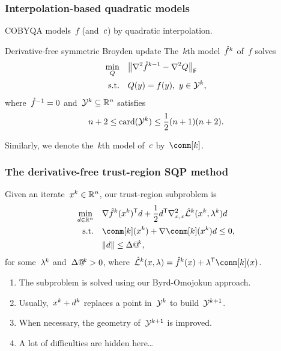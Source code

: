 \documentclass{polyu-presentation}
\makeatletter
\newcommand{\con}[1][]{c\ifthenelse{\equal{#1}{}}{}{_{#1}}}
\newcommand{\iter}[1][]{x\ifthenelse{\equal{#1}{}}{}{^{#1}}}
\newcommand{\lagm}[1][]{\hat{\mathcal{L}}\ifthenelse{\equal{#1}{}}{}{^{#1}}}
\newcommand{\lm}[1][]{\lambda\ifthenelse{\equal{#1}{}}{}{^{#1}}}
\newcommand{\obj}{f}
\newcommand{\objm}[1][]{\hat{f}\ifthenelse{\equal{#1}{}}{}{^{#1}}}
\newcommand{\rad}[1][]{\Delta\ifthenelse{\equal{#1}{}}{}{@\!^{#1}}}
\newcommand{\step}[1][]{d\ifthenelse{\equal{#1}{}}{}{^{#1}}}
\newcommand{\xpt}[1][]{\mathcal{Y}\ifthenelse{\equal{#1}{}}{}{^{#1}}}
\makeatother
\begin{document}
\begin{frame}
    \frametitle{Interpolation-based quadratic models}
    
	COBYQA models~$\obj$ (and~$\con$) by \alert{quadratic} interpolation.

    \medskip

    \begin{block}{Derivative-free symmetric Broyden update}
        The~$k$th model~$\objm[k]$ of~$\obj$ solves
        \begin{align*}
            \min_{Q}    & \quad \norm[\big]{\nabla^2 \objm[k - 1] - \nabla^2 Q}_{\mathsf{F}}\\
            \text{s.t.} & \quad Q(y) = \obj(y), ~ y \in \xpt[k],
        \end{align*}
        where~$\objm[-1] = 0$ and~$\xpt[k] \subseteq \R^n$ satisfies
        \begin{equation*}
            n + 2 \le \card(\xpt[k]) \le \frac{1}{2} (n + 1) (n + 2).
        \end{equation*}
    \end{block}

    \medskip

    Similarly, we denote the~$k$th model of~$\con$ by~$\conm[k]$.
\end{frame}

\begin{frame}
    \frametitle{The derivative-free trust-region SQP method}

    Given an iterate~$\iter[k] \in \R^n$, our \alert{trust-region} subproblem is
    \begin{align*}
        \min_{\step \in \R^n}   & \quad \nabla \objm[k](\iter[k])^{\T} \step + \frac{1}{2} \step^{\T} \nabla_{x, x}^2 \lagm[k](\iter[k], \lm[k]) \step\\
        \text{s.t.}             & \quad \conm[k](\iter[k]) + \nabla \conm[k](\iter[k]) \step \le 0,\\
                                & \quad \norm{\step} \le \rad[k],
    \end{align*}
    for some~$\lm[k]$ and~$\rad[k] > 0$, where~$\lagm[k](\iter, \lm) = \objm[k](\iter) + \lm^{\T} \conm[k](\iter)$.

    \medskip

    \begin{block}{}
        \begin{enumerate}
            \item The subproblem is solved using our \alert{Byrd-Omojokun} approach.
            \item Usually,~$\iter[k] + \step[k]$ replaces a point in~$\xpt[k]$ to build~$\xpt[k + 1]$.
            \item When necessary, the \alert{geometry} of~$\xpt[k + 1]$ is improved.
            \item A lot of \alert{difficulties} are hidden here\dots
        \end{enumerate}
    \end{block}
\end{frame}
\end{document}
